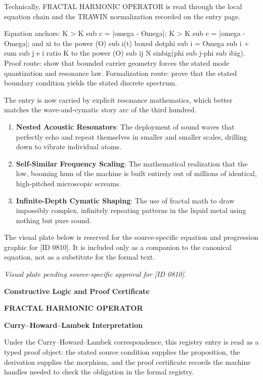 Technically, FRACTAL HARMONIC OPERATOR is read through the local equation chain and the TRAWIN normalization recorded on the entry page.

Equation anchors: K > K sub c = |omega - Omega|; K > K sub c = |omega - Omega|; and xi to the power (O) sub i(t) boxed dotphi sub i = Omega sub i + sum sub j e i ratio K to the power (O) sub ij N sinbig(phi sub j-phi sub ibig). Proof route: show that bounded carrier geometry forces the stated mode quantization and resonance law. Formalization route: prove that the stated boundary condition yields the stated discrete spectrum.

The entry is now carried by explicit resonance mathematics, which better matches the wave-and-cymatic story arc of the third hundred.
\endgroup

\begin{enumerate}[leftmargin=1.6em,itemsep=6pt,topsep=4pt]
\item \textbf{Nested Acoustic Resonators}: The deployment of sound waves that perfectly echo and repeat themselves in smaller and smaller scales, drilling down to vibrate individual atoms.
\item \textbf{Self-Similar Frequency Scaling}: The mathematical realization that the low, booming hum of the machine is built entirely out of millions of identical, high-pitched microscopic screams.
\item \textbf{Infinite-Depth Cymatic Shaping}: The use of fractal math to draw impossibly complex, infinitely repeating patterns in the liquid metal using nothing but pure sound.
\end{enumerate}

\begingroup\footnotesize\sloppy
The visual plate below is reserved for the source-specific equation and progression graphic for [ID 0810]. It is included only as a companion to the canonical equation, not as a substitute for the formal text.
\par\endgroup
\begingroup\footnotesize\itshape
Visual plate pending source-specific approval for [ID 0810].
\par\endgroup

\clearpage
\begingroup\tzpsupportsetup
\noindent\textbf{\fontsize{10.8pt}{12.8pt}\selectfont [ID 0810] Constructive Logic and Proof Certificate}\par
\noindent\textbf{\fontsize{10pt}{12pt}\selectfont FRACTAL HARMONIC OPERATOR}\par
\vspace{0.45em}
\begingroup
\footnotesize
\setlength{\parskip}{0.22em}
\setlength{\parindent}{0pt}
\noindent\textbf{Curry--Howard--Lambek Interpretation}\par
Under the Curry--Howard--Lambek correspondence, this registry entry is read as a typed proof
object: the stated source condition supplies the proposition, the derivation supplies the
morphism, and the proof certificate records the machine handles needed to check the obligation
in the formal registry.

